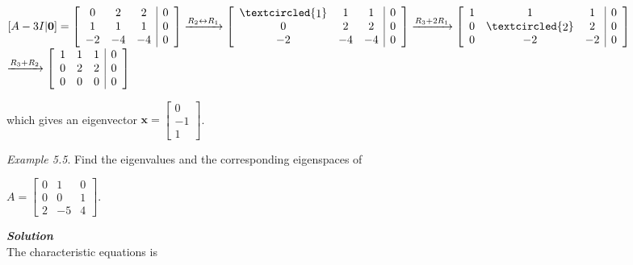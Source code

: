\documentclass[
  letterpaper,
  DIV=11,
  numbers=noendperiod]{scrartcl}
\theoremstyle{remark}
\begin{document}
\(\left[A - 3I | \mathbf{0}\right] = \left[\begin{array}{ccc | c} 0 & 2 & 2 & 0 \\ 1 & 1 & 1 & 0 \\ -2 & -4 & -4 & 0 \end{array}\right] \xrightarrow{R_{2} \leftrightarrow R_{1}} \left[\begin{array}{ccc | c} \textcircled{\raisebox{-0.9pt}{1}} & 1 & 1 & 0 \\ 0 & 2 & 2 & 0 \\ -2 & -4 & -4 & 0 \end{array}\right] \xrightarrow{R_{3} + 2R_{1}} \left[\begin{array}{ccc | c} 1 & 1 & 1 & 0 \\ 0 & \textcircled{\raisebox{-0.9pt}{2}} & 2 & 0 \\ 0 & -2 & -2 & 0 \end{array}\right]\)\\
\(\xrightarrow{R_{3} + R_{2}} \left[\begin{array}{ccc | c} 1 & 1 & 1 & 0 \\ 0 & 2 & 2 & 0 \\ 0 & 0 & 0 & 0 \end{array}\right]\)

which gives an eigenvector
\(\mathbf{x} = \left[\begin{array}{c} 0 \\ -1 \\ 1 \end{array}\right]\).

\emph{Example 5.5}. Find the eigenvalues and the corresponding
eigenspaces of

\(A = \left[\begin{array}{ccc}
        0 & 1 & 0 \\
        0 & 0 & 1 \\
        2 & -5 & 4
    \end{array}\right]\).

\textbf{\emph{Solution}}\\
The characteristic equations is
\end{document}
